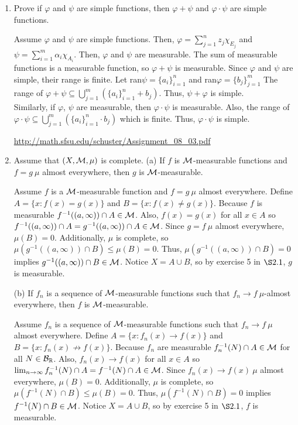 
\begin{enumerate}
\item Prove if $\varphi$ and $\psi$ are simple functions, then $\varphi + \psi$ and $\varphi \cdot \psi$ are simple functions.	
\begin{pf}
Assume 	$\varphi$ and $\psi$ are simple functions. Then, $\varphi=\sum_{j=1}^{n}z_j\chi_{E_j}$ and $\psi=\sum_{i=1}^{m}\alpha_i\chi_{A_i}$. Then, $\varphi$ and $\psi$ are measurable. The sum of measurable functions is a measurable function, so $\varphi + \psi$ is measurable. Since $\varphi$ and $\psi$ are simple, their range is finite. Let ran$\psi=\{a_i\}_{i=1}^n$ and ran$\varphi=\{ b_j \}_{j=1}^m$ The range of $\varphi + \psi \subseteq \bigcup_{j=1}^m (\{a_i\}_{i=1}^n+b_j)$. Thus, $\psi + \varphi$ is simple. \\
Similarly, if $\varphi$, $\psi$ are measurable, then $\varphi \cdot \psi$ is measurable. Also, the range of $\varphi \cdot \psi \subseteq \bigcup_{j=1}^m (\{a_i\}_{i=1}^n\cdot b_j)$ which is finite. Thus, $\varphi \cdot \psi$ is simple. 
\end{pf}

 \url{http://math.sfsu.edu/schuster/Assignment_08_03.pdf} 
\item Assume that $(X, {\mathcal M}, \mu)$ is complete.
(a) If $f$ is ${\mathcal M}$-measurable functions and $f=g \ \mu$ almost everywhere, then $g$ is ${\mathcal M}$-measurable.
\begin{pf}
	Assume $f$ is a ${\mathcal M}$-measurable function and $f=g \ \mu$ almost everywhere. Define $A=\{ x: f(x)=g(x)\}$ and $B=\{x : f(x) \neq g(x)\}$. Because $f$ is measurable $f^{-1}((a,\infty)) \cap A \in {\mathcal M}$. Also, $f(x)=g(x)$ for all $x \in A$ so $f^{-1}((a,\infty)) \cap A =g^{-1}((a, \infty)) \cap A\in {\mathcal M}$.  Since $g=f \ \mu$ almost everywhere, $\mu(B)=0$. Additionally, $\mu$ is complete, so $\mu(g^{-1}((a,\infty))\cap B)\leq \mu(B)=0$. Thus, $\mu(g^{-1}((a,\infty))\cap B)=0$ implies $g^{-1}((a,\infty))\cap B \in {\mathcal M}$. Notice $X = A \cup B$, so by exercise 5 in $\S 2.1$, $g$ is measurable.  \end{pf}

(b) If $f_n$ is a sequence of ${\mathcal M}$-measurable functions such that $f_n \rightarrow f \ \mu$-almost everywhere, then $f$ is ${\mathcal M}$-measurable. 
 \begin{pf}
 Assume $f_n$ is a sequence of ${\mathcal M}$-measurable functions such that $f_n \rightarrow f \ \mu$ almost everywhere. Define $A=\{ x: f_n(x) \rightarrow f(x) \}$ and $B=\{x : f_n(x) \not\rightarrow f(x)\}$. Because $f_n$ are measurable $f_n^{-1}(N) \cap A \in {\mathcal M}$ for all $N \in {\mathcal B}_{\mathbb R}$. Also, $f_n(x) \rightarrow f(x)$ for all $x \in A$ so $\lim_{n\rightarrow \infty}f_n^{-1}(N) \cap A =f^{-1}(N) \cap A\in {\mathcal M}$.  Since $f_n(x) \rightarrow f(x) \ \mu$ almost everywhere, $\mu(B)=0$. Additionally, $\mu$ is complete, so $\mu(f^{-1}(N)\cap B)\leq \mu(B)=0$. Thus, $\mu(f^{-1}(N)\cap B)=0$ implies $f^{-1}(N)\cap B \in {\mathcal M}$. Notice $X = A \cup B$, so by exercise 5 in $\S 2.1$, $f$ is measurable.	
 \end{pf}
\end{enumerate}

